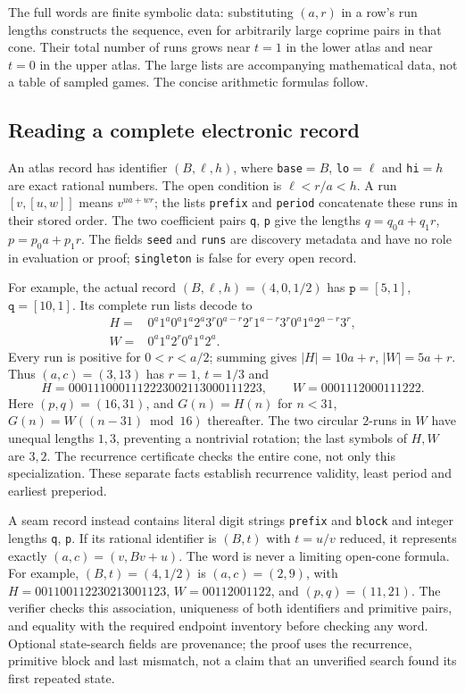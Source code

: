 \documentclass[11pt]{article}
\theoremstyle{remark}\newtheorem{remark}[theorem]{Remark}
\begin{document}
The full words are finite symbolic data: substituting $(a,r)$ in a row's run lengths constructs the sequence, even for arbitrarily large coprime pairs in that cone. Their total number of runs grows near $t=1$ in the lower atlas and near $t=0$ in the upper atlas. The large lists are accompanying mathematical data, not a table of sampled games. The concise arithmetic formulas follow.

\subsection{Reading a complete electronic record}\label{sec:record-example}
An atlas record has identifier $(B,\ell,h)$, where \texttt{base}$=B$,
\texttt{lo}$=\ell$ and \texttt{hi}$=h$ are exact rational numbers.
The open condition is $\ell<r/a<h$. A run
$[v,[u,w]]$ means $v^{ua+wr}$; the lists \texttt{prefix} and
\texttt{period} concatenate these runs in their stored order.
The two coefficient pairs \texttt{q}, \texttt{p} give the lengths
$q=q_0a+q_1r$, $p=p_0a+p_1r$. The fields \texttt{seed} and
\texttt{runs} are discovery metadata and have no role in evaluation or proof;
\texttt{singleton} is false for every open record.

For example, the actual record $(B,\ell,h)=(4,0,1/2)$ has
$\texttt{p}=[5,1]$, $\texttt{q}=[10,1]$. Its complete run lists decode to
\begin{align*}
H={}&0^a1^a0^a1^a2^a3^r0^{a-r}2^r1^{a-r}3^r
       0^a1^a2^{a-r}3^r,\\
W={}&0^a1^a2^r0^a1^a2^a.
\end{align*}
Every run is positive for $0<r<a/2$; summing gives $|H|=10a+r$,
$|W|=5a+r$. Thus $(a,c)=(3,13)$ has $r=1$, $t=1/3$ and
\[
H=0001110001112223002113000111223,\qquad
W=0001112000111222.
\]
Here $(p,q)=(16,31)$, and $G(n)=H(n)$ for $n<31$,
$G(n)=W((n-31)\bmod16)$ thereafter. The two circular $2$-runs
in $W$ have unequal lengths $1,3$, preventing a nontrivial rotation;
the last symbols of $H,W$ are $3,2$. The recurrence certificate checks
the entire cone, not only this specialization. These separate facts
establish recurrence validity, least period and earliest preperiod.

A seam record instead contains literal digit strings \texttt{prefix}
and \texttt{block} and integer lengths \texttt{q}, \texttt{p}.
If its rational identifier is $(B,t)$ with $t=u/v$ reduced, it represents
exactly $(a,c)=(v,Bv+u)$. The word is never a limiting open-cone formula.
For example, $(B,t)=(4,1/2)$ is $(a,c)=(2,9)$, with
$H=001100112230213001123$, $W=00112001122$, and $(p,q)=(11,21)$.
The verifier checks this association, uniqueness of both identifiers and
primitive pairs, and equality with the required endpoint inventory before
checking any word. Optional state-search fields are provenance; the proof
uses the recurrence, primitive block and last mismatch, not a claim that
an unverified search found its first repeated state.
\end{document}
